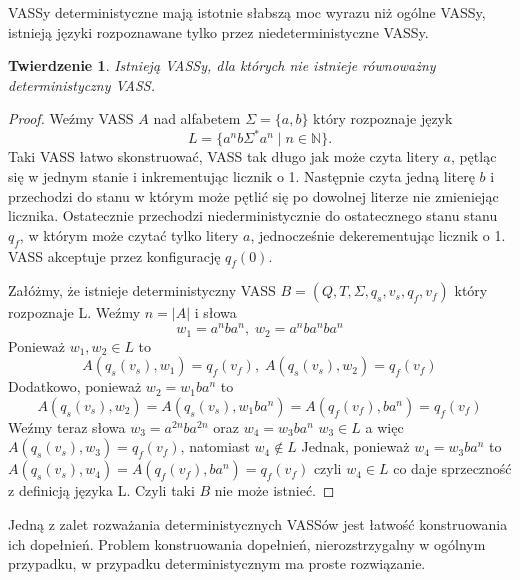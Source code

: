 \documentclass[magisterska]{pracamgr}
\newtheorem{theorem}{Twierdzenie}[section]
\newtheorem{proof}[theorem]{Dowód}
\begin{document}
    VASSy deterministyczne mają istotnie słabszą moc wyrazu niż ogólne VASSy, istnieją języki rozpoznawane tylko przez niedeterministyczne VASSy.
    \begin{theorem}
        \label{non-det}
        Istnieją VASSy, dla których nie istnieje równoważny deterministyczny VASS.
    \end{theorem}
    \begin{proof}
        Weźmy VASS $A$ nad alfabetem $\Sigma = \{a,b\}$  który rozpoznaje język  \[L = \{a^n b \Sigma^* a^n \mid n \in \mathbb{N}\}.\]
        Taki VASS łatwo skonstruować, VASS tak długo jak może czyta litery $a$, pętląc się w jednym stanie i inkrementując licznik o 1.
        Następnie czyta jedną literę $b$ i przechodzi do stanu w którym może pętlić się po dowolnej literze nie zmieniejąc licznika.
        Ostatecznie przechodzi niederministycznie do ostatecznego stanu stanu $q_f$, w którym może czytać tylko litery $a$, jednocześnie dekerementując licznik o 1.
        VASS akceptuje przez konfigurację $q_f(0)$.


        Załóżmy, że istnieje deterministyczny VASS $B=(Q,T,\Sigma,q_s,v_s,q_f,v_f)$ który rozpoznaje L.
        Weźmy $n=|A|$ i słowa \[w_1 = a^n b a^n,\; w_2 = a^n b a^n b a^n\]
        Ponieważ $w_1,w_2 \in L$ to \[A(q_s(v_s),w_1) = q_f(v_f), \;A(q_s(v_s),w_2) = q_f(v_f)\]
        Dodatkowo, ponieważ $w_2 = w_1 b a^n$ to \[A(q_s(v_s),w_2) = A(q_s(v_s),w_1 b a^n)  = A(q_f(v_f),b a^n) = q_f(v_f) \]
        Weźmy teraz słowa $w_3 = a^{2n} b a^{2n} $ oraz $w_4 =  w_3 b a^n $
        $w_3 \in L$ a więc $A(q_s(v_s),w_3) = q_f(v_f)$, natomiast $w_4 \notin L$
        Jednak, ponieważ $w_4 =  w_3 b a^n $ to $A(q_s(v_s),w_4) = A(q_f(v_f),b a^n) = q_f(v_f)$ czyli $w_4 \in L$
        co daje sprzeczność z definicją języka L. Czyli taki $B$ nie może istnieć.
    \end{proof}

    Jedną z zalet rozważania deterministycznych VASSów jest łatwość konstruowania ich dopełnień.
    Problem konstruowania dopełnień, nierozstrzygalny w ogólnym przypadku, w przypadku deterministycznym ma proste rozwiązanie.
\end{document}
